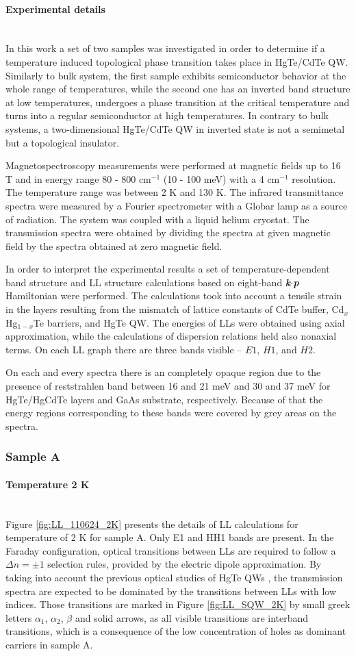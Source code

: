 \documentclass[titlepage,a4paper]{book}
\newcommand{\wciecie}{\quad\phantom{v}}
\newcommand{\myparagraph}[1]{\paragraph{#1}\mbox{}\\}
\begin{document}
\myparagraph{Experimental details}
\wciecie
In this work a set of two samples was investigated in order to determine if a temperature induced topological phase transition takes place in HgTe/CdTe QW. Similarly to bulk system, the first sample exhibits semiconductor behavior at the whole range of temperatures, while the second one has an inverted band structure at low temperatures, undergoes a phase transition at the critical temperature and turns into a regular semiconductor at high temperatures. In contrary to bulk systems, a two-dimensional HgTe/CdTe QW in inverted state is not a semimetal but a topological insulator. 

Magnetospectroscopy measurements were performed at magnetic fields up to 16 T and in energy range 80 - 800 cm$^{-1}$ (10 - 100 meV) with a 4 cm$^{-1}$ resolution. The temperature range was between 2 K and 130 K. The infrared transmittance spectra were measured by a Fourier spectrometer with a Globar lamp as a source of radiation. The system was coupled with a liquid helium cryostat. The transmission spectra were obtained by dividing the spectra at given magnetic field by the spectra obtained at zero magnetic field.

In order to interpret the experimental results a set of temperature-dependent band structure and LL structure calculations based on eight-band \textbf{\textit{k}}$\cdot$\textbf{\textit{p}} Hamiltonian were performed. The calculations took into account a tensile strain in the layers resulting from the mismatch of lattice constants of CdTe buffer, Cd$_{x}$Hg$_{1-x}$Te barriers, and HgTe QW. The energies of LLs were obtained using axial approximation, while the calculations of dispersion relations held also nonaxial terms. On each LL graph there are three bands visible -- $E1$, $H1$, and $H2$.

On each and every spectra there is an completely opaque region due to the presence of reststrahlen band between 16 and 21 meV and 30 and 37 meV for HgTe/HgCdTe layers and GaAs substrate, respectively. Because of that the energy regions corresponding to these bands were covered by grey areas on the spectra.

\subsubsection{Sample A}
\myparagraph{Temperature 2 K}
\wciecie
Figure \ref{fig:LL_110624_2K} presents the details of LL calculations for temperature of 2 K for sample A. Only E1 and HH1 bands are present. In the Faraday configuration, optical transitions between LLs are required to follow a $\Delta n = \pm 1$ selection rules, provided by the electric dipole approximation. By taking into account the previous optical studies of HgTe QWs \cite{Schultz}\cite{Orlita_MCT_QW}\cite{Zholudev_MCT_QW}\cite{Ikonnikov_MCT_SQW}\cite{Ludwig_MCT_QW}\cite{Zholudev_MCT_QW_anticrossing}, the transmission spectra are expected to be dominated by the transitions between LLs with low indices. Those transitions are marked in Figure \ref{fig:LL_SQW_2K} by small greek letters $\alpha_1$, $\alpha_2$, $\beta$ and solid arrows, as all visible transitions are interband transitions, which is a consequence of the low concentration of holes as dominant carriers in sample A. 
\end{document}
